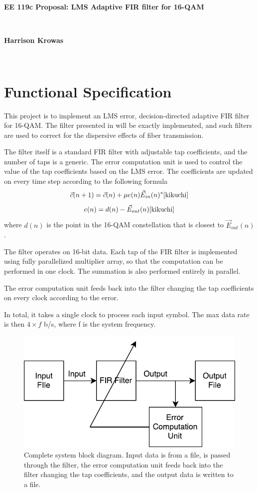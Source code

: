 \documentclass[11pt]{article}
\begin{document}
{\huge
\begin{center}
\textbf{EE 119c Proposal: LMS Adaptive FIR filter for 16-QAM}
\

\


\textbf{Harrison Krowas}
\

\
\end{center}
}

\section{Functional Specification}

This project is to implement an LMS error, decision-directed adaptive FIR filter for 16-QAM. The filter presented in \cite{kikuchi} will be exactly implemented, and such filters are used to correct for the dispersive effects of fiber transmission.

The filter itself is a standard FIR filter with adjustable tap coefficients, and the number of taps is a generic. The error computation unit is used to control the value of the tap coefficients based on the LMS error. The coefficients are updated on every time step according to the following formula
\[
\vec{c}(n + 1) = \vec{c}(n) + \mu e(n) \vec{E}_{in}(n)^{*}\cite{kikuchi}
\]
\[
e(n) = d(n) - \vec{E}_{out}(n)\cite{kikuchi}
\]
where $d(n)$ is the point in the 16-QAM constellation that is closest to $\vec{E}_{out}(n)$.

The filter operates on 16-bit data. Each tap of the FIR filter is implemented using fully parallelized multiplier array, so that the computation can be performed in one clock. The summation is also performed entirely in parallel.

The error computation unit feeds back into the filter changing the tap coefficients on every clock according to the error.

In total, it takes a single clock to process each input symbol. The max data rate is then $4 \times f$ b/s, where f is the system frequency.

\begin{figure}
\begin{center}
\includegraphics{adaptive_filter_block_diagram}
\caption{Complete system block diagram. Input data is from a file, is passed through the filter, the error computation unit feeds back into the filter changing the tap coefficients, and the output data is written to a file.}
\end{center}
\end{figure}
\end{document}

